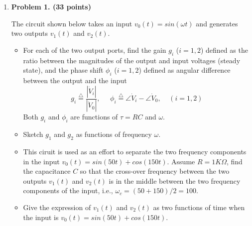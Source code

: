 \begin{enumerate}

\item {\bf Problem 1. (33 points)} 

The circuit shown below takes an input $v_0(t)=sin(\omega t)$ and generates 
two outputs $v_1(t)$ and $v_2(t)$. 


\begin{itemize}
\item For each of the two output ports, find the gain $g_i$ ($i=1,2$) 
defined as the ratio between the magnitudes of the output and input 
voltages (steady state), and the phase shift $\phi_i$ ($i=1,2$) defined
as angular difference between the output and the input
\[ g_i\stackrel{\triangle}{=}\frac{|\dot{V}_i|}{|\dot{V}_0|},\;\;\;\;\;
\phi_i\stackrel{\triangle}{=}\angle \dot{V}_i-\angle \dot{V}_0,\;\;\;\;
(i=1,2) \]
Both $g_i$ and $\phi_i$ are functions of $\tau=RC$ and $\omega$.

\item Sketch $g_1$ and $g_2$ as functions of frequency $\omega$.

\item This ciruit is used as an effort to separate the two frequency components 
in the input $v_0(t)=sin(50 t)+cos(150 t)$. Assume $R=1K\Omega$, find the 
capacitance $C$ so that the cross-over frequency between the two outputs 
$v_1(t)$ and $v_2(t)$ is in the middle between the two frequency components
of the input, i.e., $\omega_c=(50+150)/2=100$.

\item Give the expression of $v_1(t)$ and $v_2(t)$ as two functions of time
  when the input is $v_0(t)=sin(50 t)+cos(150 t)$.

\end{itemize}


\end{enumerate}
